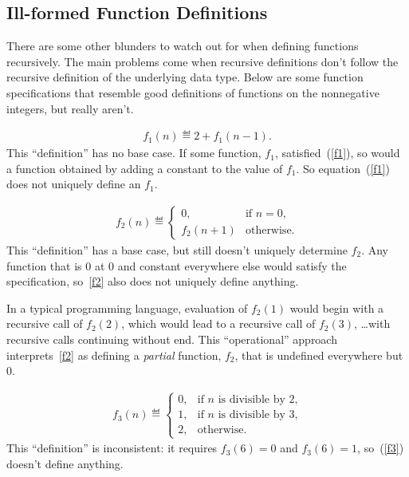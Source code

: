 \subsection{Ill-formed Function Definitions}

There are some other blunders to watch out for when defining functions
recursively.  The main problems come when recursive definitions don't
follow the recursive definition of the underlying data type.  Below are
some function specifications that resemble good definitions of functions
on the nonnegative integers, but really aren't.

\begin{eqnarray}\label{f1}
f_1(n)\eqdef 2+f_1(n-1).
\end{eqnarray}
This ``definition'' has no base case.  If some function, $f_1$,
satisfied~(\ref{f1}), so would a function obtained by adding a constant to
the value of $f_1$.  So equation~(\ref{f1}) does not uniquely define
an $f_1$.

\begin{eqnarray}\label{f2}
f_2(n) \eqdef
\begin{cases}
 0, & \text{if $n=0$},\\
 f_2(n+1) &  \text{otherwise}.
\end{cases}
\end{eqnarray}
This ``definition'' has a base case, but still doesn't uniquely determine
$f_2$.  Any function that is 0 at 0 and constant everywhere else would
satisfy the specification, so~\eqref{f2} also does not uniquely define
anything.

In a typical programming language, evaluation of $f_2(1)$ would begin with
a recursive call of $f_2(2)$, which would lead to a recursive call of
$f_2(3)$, \dots with recursive calls continuing without end.  This
``operational'' approach interprets~\eqref{f2} as defining a
\emph{partial} function, $f_2$, that is undefined everywhere but 0.

\begin{eqnarray}\label{f3}
f_3(n) \eqdef \begin{cases}
  0, &  \text{if $n$ is divisible by 2,}\\
  1, &  \text{if $n$ is divisible by 3,}\\
  2, & \text{otherwise.}
 \end{cases}
\end{eqnarray}
This ``definition'' is inconsistent: it requires $f_3(6) = 0$ and $f_3(6)
=1$, so~(\ref{f3}) doesn't define anything.

